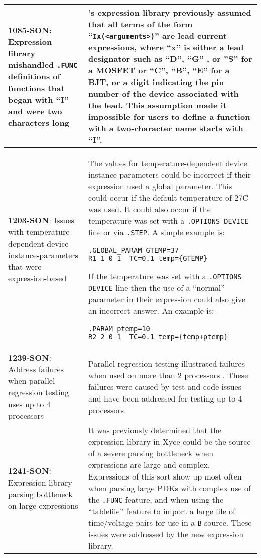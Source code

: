 {\begin{longtable}[h] {>{\raggedright\small}m{2in}|>{\raggedright\let\\\tabularnewline\small}m{3.5in}}
\textbf{1085-SON}: Expression library mishandled \texttt{.FUNC} 
definitions of functions that began with ``I'' and were two characters long &
\Xyce{}'s expression library previously assumed that all terms of the form
``\texttt{Ix(<arguments>)}'' are lead current expressions, where ``x'' is
either a lead designator such as ``D'', ``G'' , or ''S'' for a MOSFET
or ``C'', ``B'', ``E'' for a BJT, or a digit indicating the pin number
of the device associated with the lead.  This assumption made it
impossible for users to define a function with a two-character name
starts with ``I''.  
\\ \hline

\textbf{1203-SON}: Issues with temperature-dependent device
instance-parameters that were expression-based & The values for
temperature-dependent device instance parameters could be incorrect
if their expression used a global parameter. This could occur if the
default temperature of 27C was used.  It could also occur if the
temperature was set with a \texttt{.OPTIONS DEVICE} line or via
\texttt{.STEP}.  A simple example is:
\begin{verbatim}
.GLOBAL_PARAM GTEMP=37
R1 1 0 1  TC=0.1 temp={GTEMP}
\end{verbatim}
If the temperature was set with a \texttt{.OPTIONS DEVICE} line then
the use of a ``normal'' parameter in their expression could also give
an incorrect answer.  An example is:
\begin{verbatim}
.PARAM ptemp=10
R2 2 0 1  TC=0.1 temp={temp+ptemp}
\end{verbatim}
\\ \hline

\textbf{1239-SON}: Address failures when parallel regression testing uses up to 4 processors &
Parallel regression testing illustrated failures when used on more than 2 processors
. These failures were caused by test and code issues and have been addressed for testing up to 4 processors.
\\ \hline

\textbf{1241-SON}: Expression library parsing bottleneck on large expressions &
It was previously determined that the expression library in Xyce could be the
source of a severe parsing bottleneck when expressions are large and
complex.  Expressions of this sort show up most often when parsing
large PDKs with complex use of the \texttt{.FUNC} feature, and when
using the ``tablefile'' feature to import a large file of time/voltage
pairs for use in a \texttt{B} source.  These issues were addressed by the new expression library.
\\ \hline


\end{longtable}}
